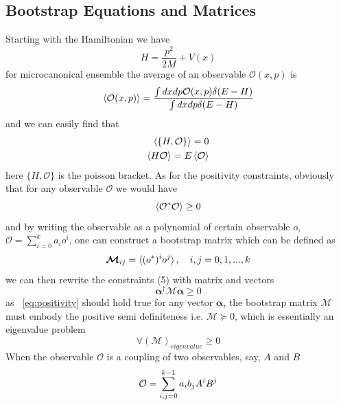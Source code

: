 \documentclass[aps, preprint,amsmath, amssymb]{revtex4-2}
\begin{document}
\subsection{Bootstrap Equations and Matrices}
Starting with the Hamiltonian we have
\begin{equation}
    H = \frac{p^2}{2M} + V(x)\label{eq:hamiltonian}
\end{equation}
for microcanonical ensemble the average of an observable $\mathcal{O}(x, p)$ is
\begin{equation}
    \braket{\mathcal{O}(x, p)} = \frac{\int dxdp\mathcal{O}(x, p)\delta (E - H)}{\int dxdp\delta (E - H)}
\end{equation}
and we can easily find that
\begin{align}
    \braket{\{H, \mathcal{O}\}} = 0 \label{eq:beq0}\\
    \braket{H \mathcal{O}} = E \braket{\mathcal{O}} \label{eq:beq1}
\end{align}
here $\{H, \mathcal{O}\}$ is the poisson bracket.
As for the positivity constraints, obviously that for any observable $\mathcal{O}$ we would have
\begin{equation}
    \braket{\mathcal{O}^* \mathcal{O}} \geq 0 \label{eq:pos}
\end{equation}
and by writing the observable as a polynomial of certain observable $o$, $\mathcal{O} = \sum_{i = 0}^k a_i o^i$, one can construct a bootstrap matrix which can be defined as
\begin{equation}
    \bm{\mathcal{M}}_{ij} = \braket{(o^*)^i o^j}, \ \ \ i, j = 0, 1, ..., k
\end{equation}
we can then rewrite the constraints (5) with matrix and vectors
\begin{equation}
    \bm{\alpha}^\dagger \bm{\mathcal{M} \bm{\alpha}} \geq 0\label{eq:positivity}
\end{equation}
as ~\eqref{eq:positivity} should hold true for any vector $\bm{\alpha}$, the bootstrap matrix $\bm{\mathcal{M}}$ must embody the positive semi definiteness i.e. $\bm{\mathcal{M}} \succeq 0$, which is essentially an eigenvalue problem
\begin{equation}
    \forall (\bm{\mathcal{M}})_{eigenvalue} \geq 0
\end{equation}
When the observable $\mathcal{O}$ is a coupling of two observables, say, $A$ and $B$
\begin{equation}
    \mathcal{O} = \sum_{i, j = 0}^{k - 1} a_i b_j A^i B^j\\
\end{equation}
\end{document}
